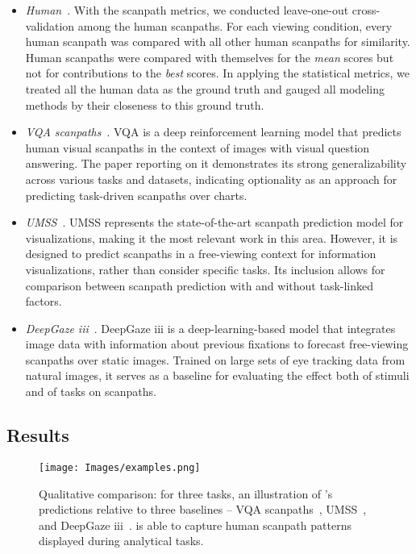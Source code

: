 \begin{itemize}
    \item \textit{Human}~\cite{polatsek2018exploring}. With the scanpath metrics, we conducted leave-one-out cross-validation among the human scanpaths. For each viewing condition, every human scanpath was compared with all other human scanpaths for similarity. Human scanpaths were compared with themselves for the \textit{mean} scores but not for contributions to the \textit{best} scores. In applying the statistical metrics, we treated all the human data as the ground truth and gauged all modeling methods by their closeness to this ground truth.
    \item \textit{VQA scanpaths}~\cite{chen2021predicting}. VQA is a deep reinforcement learning model that predicts human visual scanpaths in the context of images with visual question answering. The paper reporting on it demonstrates its strong generalizability across various tasks and datasets, indicating optionality as an approach for predicting task-driven scanpaths over charts. %
    \item \textit{UMSS}~\cite{wang2023scanpath}. UMSS represents the state-of-the-art scanpath prediction model for visualizations, making it the most relevant work in this area. However, it is designed to predict scanpaths in a free-viewing context for information visualizations, rather than consider specific tasks. Its inclusion allows for comparison between scanpath prediction with and without task-linked factors.
    \item \textit{DeepGaze iii}~\cite{kummerer2022deepgaze}. DeepGaze iii is a deep-learning-based model that integrates image data with information about previous fixations to forecast free-viewing scanpaths over static images. Trained on large sets of eye tracking data from natural images, it serves as a baseline for evaluating the effect both of stimuli and of tasks on scanpaths.
\end{itemize}


\subsection{Results}

\begin{figure*}[!t]
\centering
  \texttt{[image: Images/examples.png]}
  \caption{Qualitative comparison: for three tasks, an illustration of \name's predictions relative to three baselines -- VQA scanpaths~\cite{chen2021predicting}, UMSS~\cite{wang2023scanpath}, and DeepGaze iii~\cite{kummerer2022deepgaze}. \name is able to capture human scanpath patterns displayed during analytical tasks.}
  \label{fig:examples}
\end{figure*}

